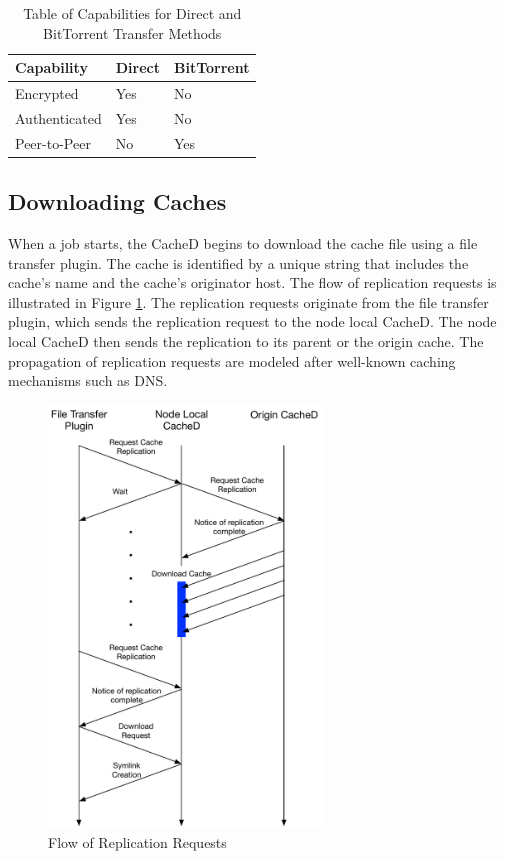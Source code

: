\begin{table}
	\centering
	\bgroup
	\def\arraystretch{1.5}
\begin{tabular}{ l | l | l }
\textbf{Capability} & \textbf{Direct} & \textbf{BitTorrent} \\ \hline
Encrypted & Yes & No \\
Authenticated & Yes & No \\
Peer-to-Peer & No & Yes \\
\end{tabular}
\egroup
\caption{Table of Capabilities for Direct and BitTorrent Transfer Methods}
\label{tab:directbittorrentcap}
\end{table}


\subsection{Downloading Caches}
When a job starts, the CacheD begins to download the cache file using a file transfer plugin.  The cache is identified by a unique string that includes the cache's name and the cache's originator host.  The flow of replication requests is illustrated in Figure \ref{fig:replicationflow}.  The replication requests originate from the file transfer plugin, which sends the replication request to the node local CacheD.  The node local CacheD then sends the replication to its parent or the origin cache.  The propagation of replication requests are modeled after well-known caching mechanisms such as DNS.

\begin{figure}[h!t]
\centering
\includegraphics[width=0.65\textwidth]{images/CacheDownloadFlow.pdf}
\caption{Flow of Replication Requests}
\label{fig:replicationflow}
\end{figure}

